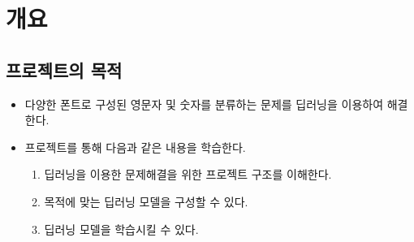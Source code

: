 \section{개요}{\label{sec:intro}}

\subsection{프로젝트의 목적}
\begin{itemize}\tightlist
    \item 다양한 폰트로 구성된 영문자 및 숫자를 분류하는 문제를 딥러닝을 이용하여 해결한다.
    \item 프로젝트를 통해 다음과 같은 내용을 학습한다.
    \begin{enumerate}[(1)]\tightlist
        \item 딥러닝을 이용한 문제해결을 위한 프로젝트 구조를 이해한다.
        \item 목적에 맞는 딥러닝 모델을 구성할 수 있다.
        \item 딥러닝 모델을 학습시킬 수 있다.
    \end{enumerate}

\end{itemize}





